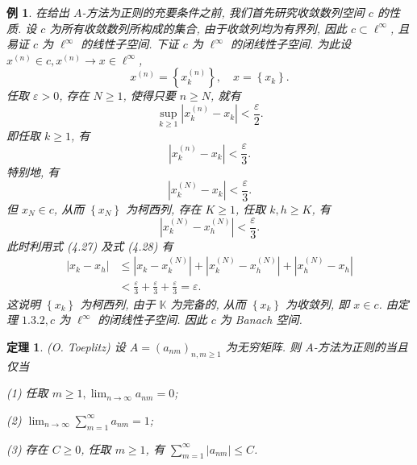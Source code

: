 \documentclass[openany]{ctexbook}
\theoremstyle{kaiti}
\newtheorem{theorem}{定理}[section]
\theoremstyle{normal}
\newtheorem{example}{例}[section]
\begin{document}
\begin{example}
在给出 $A$-方法为正则的充要条件之前, 我们首先研究收敛数列空间 $c$ 的性质. 设 $c$ 为所有收敛数列所构成的集合, 由于收敛列均为有界列, 因此 $c \subset \ell^{\infty}$, 且易证 $c$ 为 $\ell^{\infty}$ 的线性子空间. 下证 $c$ 为 $\ell^{\infty}$ 的闭线性子空间. 为此设 $x^{(n)} \in c, x^{(n)} \rightarrow x \in \ell^{\infty}$,
$$
x^{(n)}=\left\{x_{k}^{(n)}\right\}, \quad x=\left\{x_{k}\right\}.
$$
任取 $\varepsilon>0$, 存在 $N \geqslant 1$, 使得只要 $n \geqslant N$, 就有
$$
\sup_{k \geqslant 1}\left|x_{k}^{(n)}-x_{k}\right|<\frac{\varepsilon}{2}.
$$
即任取 $k \geqslant 1$, 有
$$
\left|x_{k}^{(n)}-x_{k}\right|<\frac{\varepsilon}{3}.
$$
特别地, 有
\begin{equation}
  \left|x_{k}^{(N)}-x_{k}\right|<\frac{\varepsilon}{3}.
\end{equation}
但 $x_{N} \in c$, 从而 $\left\{x_{N}\right\}$ 为柯西列, 存在 $K \geqslant 1$, 任取 $k, h \geqslant K$, 有
\begin{equation}
  \left|x_{k}^{(N)}-x_{h}^{(N)}\right|<\frac{\varepsilon}{3}.
\end{equation}
此时利用式 (4.27) 及式 (4.28) 有
$$
\begin{aligned}
\left|x_{k}-x_{h}\right| & \leqslant\left|x_{k}-x_{k}^{(N)}\right|+\left|x_{k}^{(N)}-x_{h}^{(N)}\right|+\left|x_{h}^{(N)}-x_{h}\right| \\
&<\frac{\varepsilon}{3}+\frac{\varepsilon}{3}+\frac{\varepsilon}{3}=\varepsilon.
\end{aligned}
$$
这说明 $\left\{x_{k}\right\}$ 为柯西列, 由于 $\mathbb{K}$ 为完备的, 从而 $\left\{x_{k}\right\}$ 为收敛列, 即 $x \in c$. 由定理 $1.3.2, c$ 为 $\ell^{\infty}$ 的闭线性子空间. 因此 $c$ 为 Banach 空间.
\end{example}

\begin{theorem}
(O. Toeplitz) 设 $A=\left(a_{n m}\right)_{n, m \geqslant 1}$ 为无穷矩阵. 则 $A$-方法为正则的当且仅当

(1) 任取 $m \geqslant 1, \lim_{n \rightarrow \infty} a_{n m}=0$;

(2) $\lim_{n \rightarrow \infty} \sum_{m=1}^{\infty} a_{n m}=1$;

(3) 存在 $C \geqslant 0$, 任取 $m \geqslant 1$, 有 $\sum_{m=1}^{\infty}\left|a_{n m}\right| \leqslant C$.
\end{theorem}
\end{document}
